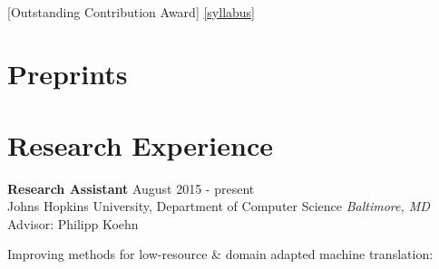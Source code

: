 \documentclass[margin,line,hyperref,color]{res}
\newenvironment{packed_itemize}{
\begin{itemize}[leftmargin=1.5em]
  \setlength{\itemsep}{0pt}
  \setlength{\parskip}{0pt}
  \setlength{\parsep}{0pt}
}{\end{itemize}}
\begin{document}
\begin{resume}




\\
{\textcolor{darkcandyapplered}{[Outstanding Contribution Award]}} \href{https://www.cs.umd.edu/class/spring2020/cmsc828B/schedule/}{[syllabus]}











\section{\sc Preprints}




\section{\sc Research Experience}


\textbf{Research Assistant} \hfill August 2015 - present\\
Johns Hopkins University, Department of Computer Science  \hfill \textit{Baltimore, MD}\\
Advisor:  Philipp Koehn
\begin{packed_itemize}
\item Improving methods for low-resource \& domain adapted machine translation:


\end{packed_itemize}
\end{resume}
\end{document}
